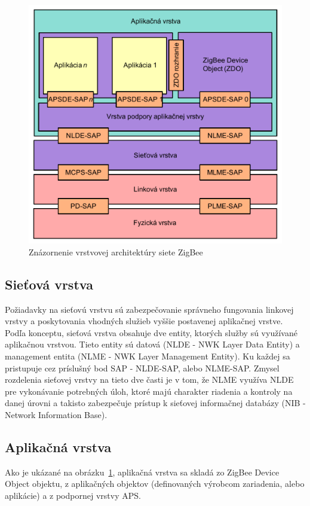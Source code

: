 \begin{figure}[htbp]
\begin{center}
\includegraphics[width=140mm]{figures/architecture_zigbee}
\caption{Znázornenie vrstvovej architektúry siete ZigBee}
\label{fig:architecture_zigbee}
\end{center}
\end{figure}

\subsection{Sieťová vrstva}
\indent\indent Požiadavky na sieťovú vrstvu sú zabezpečovanie správneho fungovania linkovej vrstvy a poskytovania vhodných služieb vyššie postavenej aplikačnej vrstve. Podľa konceptu, sieťová vrstva obsahuje dve entity, ktorých služby sú využívané aplikačnou vrstvou. Tieto entity sú datová (NLDE - NWK Layer Data Entity) a management entita (NLME - NWK Layer Management Entity). Ku každej sa pristupuje cez príslušný bod SAP - NLDE-SAP, alebo NLME-SAP. Zmysel rozdelenia sieťovej vrstvy na tieto dve časti je v tom, že NLME využíva NLDE pre vykonávanie potrebných úloh, ktoré majú charakter riadenia a kontroly na danej úrovni a takisto zabezpečuje prístup k sieťovej informačnej databázy (NIB - Network Information Base).\\

\subsection{Aplikačná vrstva}
\indent\indent Ako je ukázané na obrázku~\ref{fig:architecture_zigbee}, aplikačná vrstva sa skladá zo ZigBee Device Object objektu, z aplikačných objektov (definovaných výrobcom zariadenia, alebo aplikácie) a z podpornej vrstvy APS.\\

